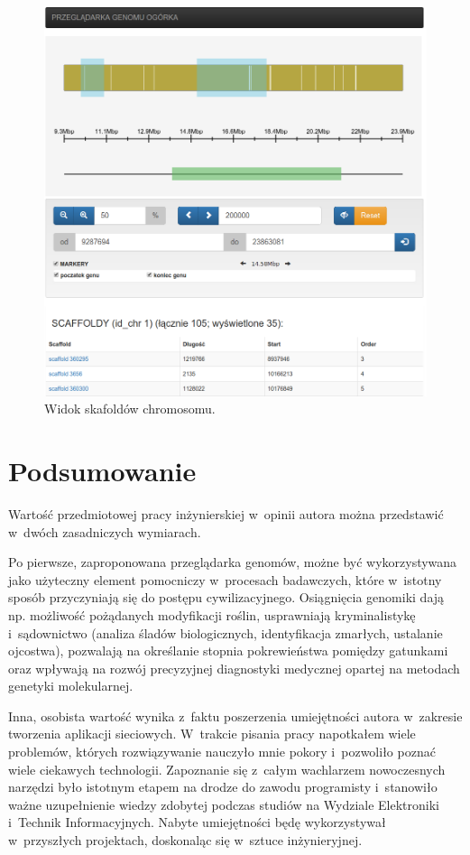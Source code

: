 \documentclass[a4paper,12pt,oneside]{mwrep}  %
\begin{document}
\begin{figure}[!h]
\centering
\includegraphics[width=1\textwidth]{grafika/skafoldy.png}
\caption{Widok skafoldów chromosomu.}
\label{skafoldy}
\end{figure}


\chapter{Podsumowanie}
Wartość przedmiotowej pracy inżynierskiej w~opinii autora można przedstawić w~dwóch zasadniczych wymiarach.

Po pierwsze, zaproponowana przeglądarka genomów, możne być wykorzystywana jako użyteczny element pomocniczy w~procesach badawczych, które w~istotny sposób przyczyniają się do postępu cywilizacyjnego. Osiągnięcia genomiki dają np. możliwość pożądanych modyfikacji roślin, usprawniają kryminalistykę i~sądownictwo (analiza śladów biologicznych, identyfikacja zmarłych, ustalanie ojcostwa), pozwalają na określanie stopnia pokrewieństwa pomiędzy gatunkami oraz wpływają na rozwój precyzyjnej diagnostyki medycznej opartej na metodach genetyki molekularnej.

Inna, osobista wartość wynika z~faktu poszerzenia umiejętności autora w~zakresie tworzenia aplikacji sieciowych. W~trakcie pisania pracy napotkałem wiele problemów, których rozwiązywanie nauczyło mnie pokory i~pozwoliło poznać wiele ciekawych technologii. Zapoznanie się z~całym wachlarzem nowoczesnych narzędzi było istotnym etapem na drodze do zawodu programisty i~stanowiło ważne uzupełnienie wiedzy zdobytej podczas studiów na Wydziale Elektroniki i~Technik Informacyjnych. Nabyte umiejętności będę wykorzystywał w~przyszłych projektach, doskonaląc się w~sztuce inżynieryjnej. 
\end{document}
